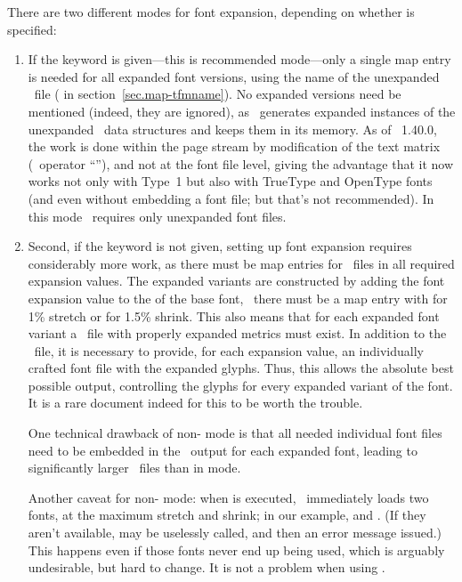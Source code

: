 \documentclass{pdftexmanual}
\begin{document}
There are two different modes for font expansion, depending on whether
 is specified:

\begin{enumerate}
\item If the  keyword is given---this is
recommended mode---only a single map entry is needed for all expanded
font versions, using the name of the unexpanded \TFM\ file
( in section~\ref{sec.map-tfmname}). No expanded
 versions need be mentioned (indeed, they are ignored),
as \PDFTEX\ generates expanded instances of the unexpanded \TFM\ data
structures and keeps them in its memory. As of \PDFTEX~1.40.0, the
 work is done within the page stream by modification of
the text matrix (\PDF\ operator ``''), and not at the font file
level, giving the advantage that it now works not only with Type~1 but
also with TrueType and OpenType fonts (and even without embedding a font
file; but that's not recommended). In this mode \PDFTEX\ requires only
unexpanded font files.

\item Second, if the  keyword is not given, setting up
font expansion requires considerably more work, as there must be map
entries for \TFM\ files in all required expansion values. The expanded
 variants are constructed by adding the font expansion
value to the  of the base font, \eg\ there must be a
map entry with   for 1\% stretch or
 for 1.5\% shrink. This also means that for each
expanded font variant a \TFM\ file with properly expanded metrics must
exist. In addition to the \TFM\ file, it is necessary to provide, for
each expansion value, an individually crafted font file with the
expanded glyphs. Thus, this allows the absolute best possible output,
controlling the glyphs for every expanded variant of the font. It is a
rare document indeed for this to be worth the trouble.

One technical drawback of non- mode is that all needed
individual font files need to be embedded in the \PDF\ output for each
expanded font, leading to significantly larger \PDF\ files than in
 mode.

Another caveat for non- mode: when 
is executed, \PDFTEX\ immediately loads two fonts, at the maximum
stretch and shrink; in our example,  and
. (If they aren't available,  may be
uselessly called, and then an error message issued.) This happens even
if those fonts never end up being used, which is arguably undesirable,
but hard to change. It is not a problem when using .
\end{enumerate}
\end{document}
